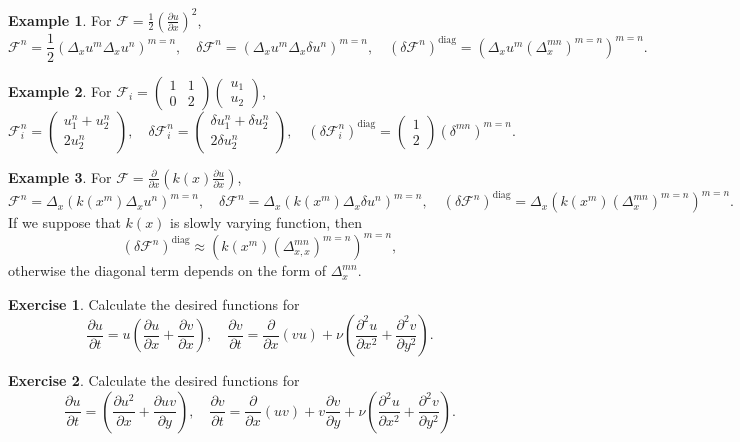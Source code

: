 \documentclass{article}
\newcommand{\pert}[1]{\delta#1}
\newcommand{\pder}[2][]{\frac{\partial#1}{\partial#2}}      %
\newcommand{\dder}[1]{\Delta_{#1}}                          %
\newcommand{\pderdual}[2][]{\frac{\partial^2#1}{\partial#2^2}}
\newcommand{\FF}{\mathcal{F}}
\newcommand{\diag}[1]{\left(#1\right)^\mathrm{diag}}
\newcommand{\diagA}[1]{\left(#1\right)^{m=n}}
\newcommand{\matr}[4]{\begin{pmatrix} #1 & #2\\#3 & #4\end{pmatrix}}
\newcommand{\vect}[2]{\begin{pmatrix} #1\\#2\end{pmatrix}}
\theoremstyle{definition}
\newtheorem{example}{Example}
\newtheorem{exercise}{Exercise}
\begin{document}
\begin{example}
    For \(\FF = \frac12\left(\pder[u]{x}\right)^2\), \[
        \FF^n = \frac12\diagA{\dder{x}u^m\dder{x}u^n}, \quad
        \pert{\FF^n} = \diagA{\dder{x}u^m\dder{x}\pert{u^n}}, \quad
        \diag{\pert{\FF^n}} = \diagA{\dder{x}u^m\diagA{\dder{x}^{mn}}}.
    \]
\end{example}
\begin{example}
    For \(\FF_i = \matr1102\vect{u_1}{u_2}\), \[
        \FF_i^n = \vect{u_1^n+u_2^n}{2u_2^n}, \quad
        \pert{\FF_i^n} = \vect{\pert{u_1^n}+\pert{u_2^n}}{2\pert{u_2^n}}, \quad
        \diag{\pert{\FF_i^n}} = \vect{1}{2}\diagA{\delta^{mn}}.
    \]
\end{example}
\begin{example}
    For \(\FF = \pder{x}\left( k(x)\pder[u]{x} \right)\), \[
        \FF^n = \dder{x}\diagA{k(x^m)\dder{x}u^n}, \quad
        \pert{\FF^n} = \dder{x}\diagA{k(x^m)\dder{x}\pert{u^n}}, \quad
        \diag{\pert{\FF^n}} = \dder{x}\diagA{k(x^m)\diagA{\dder{x}^{mn}}}.
    \]
    If we suppose that \(k(x)\) is slowly varying function, then \[
        \diag{\pert{\FF^n}} \approx \diagA{k(x^m)\diagA{\dder{x,x}^{mn}}},
    \]
    otherwise the diagonal term depends on the form of \(\dder{x}^{mn}\).
\end{example}

\begin{exercise}
    Calculate the desired functions for \[
        \pder[u]{t} = u\left(\pder[u]{x} + \pder[v]{x}\right), \quad
        \pder[v]{t} = \pder{x}(vu) + \nu\left(\pderdual[u]{x}+\pderdual[v]{y}\right).
    \]
\end{exercise}
\begin{exercise}
    Calculate the desired functions for \[
        \pder[u]{t} = \left(\pder[u^2]{x} + \pder[uv]{y}\right), \quad
        \pder[v]{t} = \pder{x}(uv) + v \pder[v]{y} + \nu\left(\pderdual[u]{x}+\pderdual[v]{y}\right).
    \]
\end{exercise}
\end{document}
